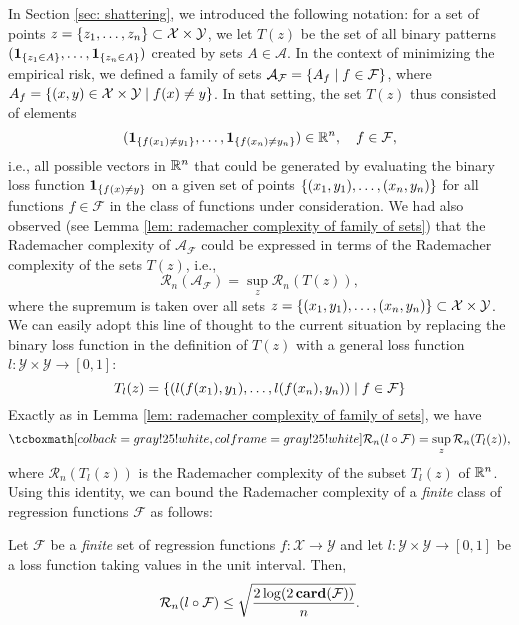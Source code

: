 In Section \ref{sec: shattering}, we introduced the following notation: for a set of points $z = \left\{z_1, \dots, z_n\right\} \subset \mathcal{X} \times \mathcal{Y}$, we let $T(z)$ be the set of all binary patterns $(\mathbf{1}_{\left\{z_1 \in A\right\}}, \dots, \mathbf{1}_{\left\{z_n \in A\right\}})$ created by sets $A \in \mathcal{A}$. In the context of minimizing the empirical risk, we defined a family of sets $\mathcal{A}_{\mathcal{F}} = \left\{A_f \mathrel{|} f \in \mathcal{F}\right\}$, where $A_f = \left\{(x, y) \in \mathcal{X} \times \mathcal{Y} \mathrel{|} f(x) \neq y\right\}$. In that setting, the set $T(z)$ thus consisted of elements
\[
    (\mathbf{1}_{\left\{f(x_1) \neq y_1\right\}}, \dots, \mathbf{1}_{\left\{f(x_n) \neq y_n\right\}}) \in \mathbb{R}^n, \quad f \in \mathcal{F},
\]
i.e., all possible vectors in $\mathbb{R}^n$ that could be generated by evaluating the binary loss function $\mathbf{1}_{\left\{f(x) \neq y\right\}}$ on a given set of points $\left\{(x_1, y_1), \dots, (x_n, y_n)\right\}$ for all functions $f \in \mathcal{F}$ in the class of functions under consideration. We had also observed (see Lemma \ref{lem: rademacher complexity of family of sets}) that the Rademacher complexity of $\mathcal{A}_{\mathcal{F}}$ could be expressed in terms of the Rademacher complexity of the sets $T(z)$, i.e.,
\[
    \mathcal{R}_n(\mathcal{A}_{\mathcal{F}}) = \sup_{z} \mathcal{R}_n(T(z)),
\]
where the supremum is taken over all sets $z = \left\{(x_1, y_1), \dots, (x_n, y_n)\right\} \subset \mathcal{X} \times \mathcal{Y}$. We can easily adopt this line of thought to the current situation by replacing the binary loss function in the definition of $T(z)$ with a general loss function $l \colon \mathcal{Y} \times \mathcal{Y} \to [0, 1]$:
\begin{equation}
    T_l(z) = \left\{( l(f(x_1), y_1), \dots, l(f(x_n), y_n) ) \mathrel{|} f \in \mathcal{F}\right\}
\end{equation}
Exactly as in Lemma \ref{lem: rademacher complexity of family of sets}, we have
\begin{equation}
\label{eq: rademacher complexity for general loss}
    \highlightMath{
        \mathcal{R}_n(l \circ \mathcal{F}) = \sup_z \mathcal{R}_n(T_l(z)),
    }
\end{equation}
where $\mathcal{R}_n(T_l(z))$ is the Rademacher complexity of the subset $T_l(z)$ of $\mathbb{R}^n$. Using this identity, we can bound the Rademacher complexity of a \emph{finite} class of regression functions $\mathcal{F}$ as follows:

\begin{proposition}
\label{prop: bound on rademacher complexity for general loss}
Let $\mathcal{F}$ be a \emph{finite} set of regression functions $f \colon \mathcal{X} \to \mathcal{Y}$ and let $l \colon \mathcal{Y} \times \mathcal{Y} \to [0, 1]$ be a loss function taking values in the unit interval. Then,
\[
    \mathcal{R}_n(l \circ \mathcal{F}) \leq \sqrt{\frac{2 \log(2 \, \mathrm{\mathbf{card}}(\mathcal{F}))}{n}}.
\]
\end{proposition}


